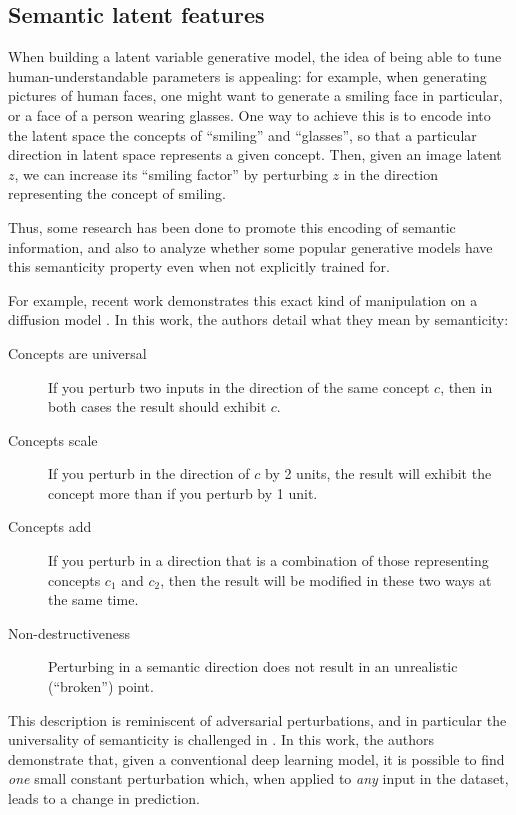 \documentclass[../main.tex]{subfiles}
\begin{document}
\subsection{Semantic latent features}

When building a latent variable generative model, the idea of being able to tune human-understandable parameters is appealing: for example, when generating pictures of human faces, one might want to generate a smiling face in particular, or a face of a person wearing glasses.
One way to achieve this is to encode into the latent space the concepts of ``smiling'' and ``glasses'', so that a particular direction in latent space represents a given concept.
Then, given an image latent $z$, we can increase its ``smiling factor'' by perturbing $z$ in the direction representing the concept of smiling.

Thus, some research has been done to promote this encoding of semantic information, and also to analyze whether some popular generative models have this semanticity property even when not explicitly trained for.

For example, recent work demonstrates this exact kind of manipulation on a diffusion model \cite{kwonDiffusion2023}.
In this work, the authors detail what they mean by semanticity:
\begin{description}
	\item[Concepts are universal] If you perturb two inputs in the direction of the same concept $c$, then in both cases the result should exhibit $c$.
\item[Concepts scale] If you perturb in the direction of $c$ by 2 units, the result will exhibit the concept more than if you perturb by 1 unit.
\item[Concepts add] If you perturb in a direction that is a combination of those representing concepts $c_1$ and $c_2$, then the result will be modified in these two ways at the same time.
	\item[Non-destructiveness] Perturbing in a semantic direction does not result in an unrealistic (``broken'') point.
\end{description}

This description is reminiscent of adversarial perturbations, and in particular the universality of semanticity is challenged in \cite{moosavi-dezfooliUniversal2017}.
In this work, the authors demonstrate that, given a conventional deep learning model, it is possible to find \emph{one} small constant perturbation which, when applied to \emph{any} input in the dataset, leads to a change in prediction.
\end{document}
